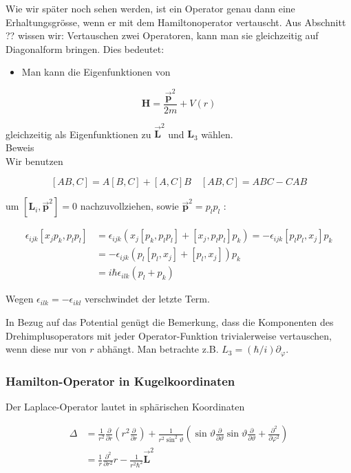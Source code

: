 \documentclass[10pt, letterpaper]{article}
\begin{document}
Wie wir später noch sehen werden, ist ein Operator genau dann eine Erhaltungsgrösse, wenn er mit dem Hamiltonoperator vertauscht. Aus Abschnitt ?? wissen wir: Vertauschen zwei Operatoren, kann man sie gleichzeitig auf Diagonalform bringen. Dies bedeutet:

\begin{itemize}
  \item Man kann die Eigenfunktionen von
\end{itemize}

$$
\mathbf{H}=\frac{\overrightarrow{\mathbf{p}}^{2}}{2 m}+V(r)
$$

gleichzeitig als Eigenfunktionen zu $\overrightarrow{\mathbf{L}}^{2}$ und $\mathbf{L}_{3}$ wählen.\\
Beweis\\
Wir benutzen

$$
[A B, C]=A[B, C]+[A, C] B \quad[A B, C]=A B C-C A B
$$

um $\left[\mathbf{L}_{i}, \overrightarrow{\mathbf{p}}^{2}\right]=0$ nachzuvollziehen, sowie $\overrightarrow{\mathbf{p}}^{2}=p_{l} p_{l}$ :

$$
\begin{aligned}
\epsilon_{i j k}\left[x_{j} p_{k}, p_{l} p_{l}\right] & =\epsilon_{i j k}\left(x_{j}\left[p_{k}, p_{l} p_{l}\right]+\left[x_{j}, p_{l} p_{l}\right] p_{k}\right)=-\epsilon_{i j k}\left[p_{l} p_{l}, x_{j}\right] p_{k} \\
& =-\epsilon_{i j k}\left(p_{l}\left[p_{l}, x_{j}\right]+\left[p_{l}, x_{j}\right]\right) p_{k} \\
& =i \hbar \epsilon_{i l k}\left(p_{l}+p_{k}\right)
\end{aligned}
$$

Wegen $\epsilon_{i l k}=-\epsilon_{i k l}$ verschwindet der letzte Term.

In Bezug auf das Potential genügt die Bemerkung, dass die Komponenten des Drehimplusoperators mit jeder Operator-Funktion trivialerweise vertauschen, wenn diese nur von $r$ abhängt. Man betrachte z.B. $L_{3}=(\hbar / i) \partial_{\varphi}$.

\subsubsection*{Hamilton-Operator in Kugelkoordinaten}
Der Laplace-Operator lautet in sphärischen Koordinaten

$$
\begin{aligned}
\Delta & =\frac{1}{r^{2}} \frac{\partial}{\partial r}\left(r^{2} \frac{\partial}{\partial r}\right)+\frac{1}{r^{2} \sin ^{2} \vartheta}\left(\sin \vartheta \frac{\partial}{\partial \vartheta} \sin \vartheta \frac{\partial}{\partial \vartheta}+\frac{\partial^{2}}{\partial \varphi^{2}}\right) \\
& =\frac{1}{r} \frac{\partial^{2}}{\partial r^{2}} r-\frac{1}{r^{2} \hbar^{2}} \overrightarrow{\mathbf{L}}^{2}
\end{aligned}
$$
\end{document}

